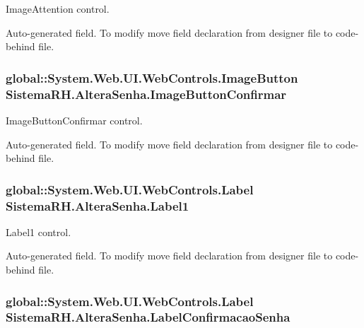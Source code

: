 ImageAttention control. 

Auto-\/generated field. To modify move field declaration from designer file to code-\/behind file. \hypertarget{class_sistema_r_h_1_1_altera_senha_aad2043736614aecaa1037c4f98a8ad60}{
\subsubsection[{ImageButtonConfirmar}]{\setlength{\rightskip}{0pt plus 5cm}global::System.Web.UI.WebControls.ImageButton {\bf SistemaRH.AlteraSenha.ImageButtonConfirmar}}}
\label{class_sistema_r_h_1_1_altera_senha_aad2043736614aecaa1037c4f98a8ad60}


ImageButtonConfirmar control. 

Auto-\/generated field. To modify move field declaration from designer file to code-\/behind file. \hypertarget{class_sistema_r_h_1_1_altera_senha_aeb89d65f52a383c6771a4cff847360bf}{
\subsubsection[{Label1}]{\setlength{\rightskip}{0pt plus 5cm}global::System.Web.UI.WebControls.Label {\bf SistemaRH.AlteraSenha.Label1}}}
\label{class_sistema_r_h_1_1_altera_senha_aeb89d65f52a383c6771a4cff847360bf}


Label1 control. 

Auto-\/generated field. To modify move field declaration from designer file to code-\/behind file. \hypertarget{class_sistema_r_h_1_1_altera_senha_a5097f0b511e0f48d077f39ad3edce159}{
\subsubsection[{LabelConfirmacaoSenha}]{\setlength{\rightskip}{0pt plus 5cm}global::System.Web.UI.WebControls.Label {\bf SistemaRH.AlteraSenha.LabelConfirmacaoSenha}}}
\label{class_sistema_r_h_1_1_altera_senha_a5097f0b511e0f48d077f39ad3edce159}


